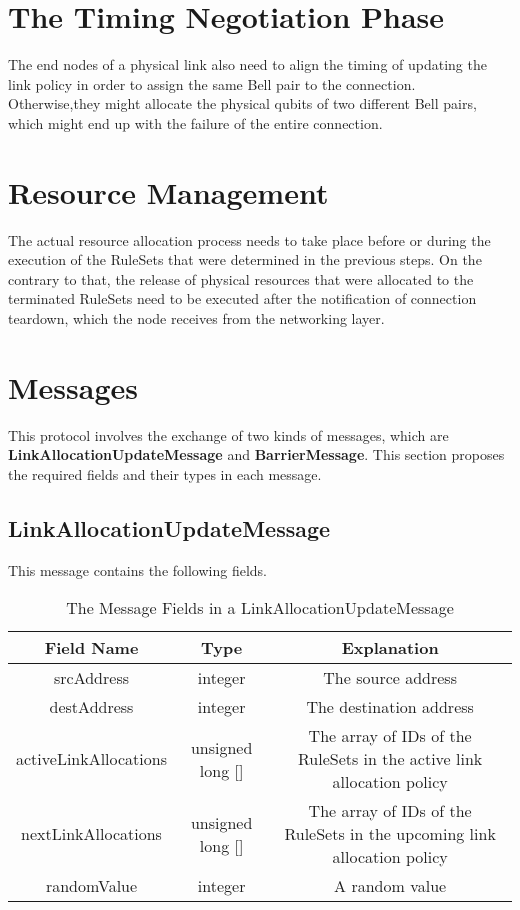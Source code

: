 \section{The Timing Negotiation Phase}

The end nodes of a physical link also need to align the timing of updating the link policy in order to assign the same Bell pair to the connection.
Otherwise,they might allocate the physical qubits of two different Bell pairs, which might end up with the failure of the entire connection.

\section{Resource Management}

The actual resource allocation process needs to take place before or during the execution of the RuleSets that were determined in the previous steps.
On the contrary to that, the release of physical resources that were allocated to the terminated RuleSets need to be executed after the notification of connection teardown, which the node receives from the networking layer.

\section{Messages}

This protocol involves the exchange of two kinds of messages, which are \textbf{LinkAllocationUpdateMessage} and \textbf{BarrierMessage}.
This section proposes the required fields and their types in each message.

\subsection{LinkAllocationUpdateMessage}
 
This message contains the following fields.

\begin{table}[ht]
  \begin{center}
    \begin{tabular}{|c|c|c|} \hline
      Field Name & Type & Explanation \\ \hline \cline{1-3}
      srcAddress & integer & The source address \\ \cline{1-3}
      destAddress & integer & The destination address \\ \cline{1-3}
      activeLinkAllocations & unsigned long [] & The array of IDs of the RuleSets in the active link allocation policy \\ \cline{1-3}
      nextLinkAllocations & unsigned long [] & The array of IDs of the RuleSets in the upcoming link allocation policy \\ \cline{1-3}
      randomValue & integer & A random value \\ \cline{1-3}
    \end{tabular}
    \caption{The Message Fields in a LinkAllocationUpdateMessage}
  \end{center}
\end{table}

